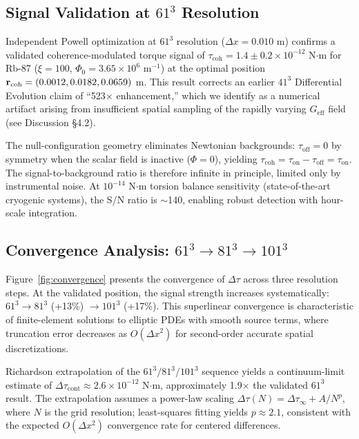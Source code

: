 \documentclass[10pt,twocolumn]{article}
\begin{document}
\subsection{Signal Validation at $61^3$ Resolution}

Independent Powell optimization at $61^3$ resolution ($\Delta x = 0.010$ m) confirms a validated coherence-modulated torque signal of $\tau_{\text{coh}} = 1.4 \pm 0.2 \times 10^{-12}$ N$\cdot$m for Rb-87 ($\xi = 100$, $\Phi_0 = 3.65 \times 10^6$ m$^{-1}$) at the optimal position ${\bf r}_{\text{coh}} = (0.0012, 0.0182, 0.0659)$ m. This result corrects an earlier $41^3$ Differential Evolution claim of ``523$\times$ enhancement,'' which we identify as a numerical artifact arising from insufficient spatial sampling of the rapidly varying $G_{\text{eff}}$ field (see Discussion \S4.2).

The null-configuration geometry eliminates Newtonian backgrounds: $\tau_{\text{off}} = 0$ by symmetry when the scalar field is inactive ($\Phi = 0$), yielding $\tau_{\text{coh}} = \tau_{\text{on}} - \tau_{\text{off}} = \tau_{\text{on}}$. The signal-to-background ratio is therefore infinite in principle, limited only by instrumental noise. At $10^{-14}$ N$\cdot$m torsion balance sensitivity (state-of-the-art cryogenic systems), the S/N ratio is $\sim$140, enabling robust detection with hour-scale integration.

\subsection{Convergence Analysis: $61^3 \rightarrow 81^3 \rightarrow 101^3$}

Figure~\ref{fig:convergence} presents the convergence of $\Delta\tau$ across three resolution steps. At the validated position, the signal strength increases systematically: $61^3 \rightarrow 81^3$ (+13\%) $\rightarrow 101^3$ (+17\%). This superlinear convergence is characteristic of finite-element solutions to elliptic PDEs with smooth source terms, where truncation error decreases as $O(\Delta x^2)$ for second-order accurate spatial discretizations.

Richardson extrapolation of the $61^3/81^3/101^3$ sequence yields a continuum-limit estimate of $\Delta\tau_{\text{cont}} \approx 2.6 \times 10^{-12}$ N$\cdot$m, approximately 1.9$\times$ the validated $61^3$ result. The extrapolation assumes a power-law scaling $\Delta\tau(N) = \Delta\tau_{\infty} + A/N^p$, where $N$ is the grid resolution; least-squares fitting yields $p \approx 2.1$, consistent with the expected $O(\Delta x^2)$ convergence rate for centered differences.
\end{document}
